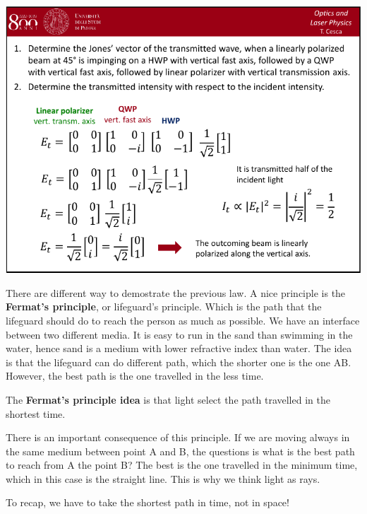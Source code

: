 \documentclass[../main/main.tex]{subfiles}
\begin{document}
\begin{minipage}[]{0.5\linewidth}
\centering
\includegraphics[page=4,width=1\textwidth]{../lessons/pdf_file/04_lecture.pdf}
\end{minipage}
\hspace{0.3cm}\vspace{0.3cm}
\begin{minipage}[c]{0.47\linewidth}

There are different way to demostrate the previous law. A nice principle is the \textbf{Fermat's principle}, or lifeguard's principle. Which is the path that the lifeguard should do to reach the person as much as possible. We have an interface between two different media. It is easy to run in the sand than swimming in the water, hence sand is a medium with lower refractive index than water. The idea is that the lifeguard can do different path, which the shorter one is the one AB. However, the best path is the one travelled in the less time.

The \textbf{Fermat's principle idea} is that light select the path travelled in the shortest time.

\end{minipage}

There is an important consequence of this principle. If we are moving always in the same medium between point A and B, the questions is what is the best path to reach from A the point B? The best is the one travelled in the minimum time, which in this case is the straight line.
This is why we think light as rays.

To recap, we have to take the shortest path in time, not in space!
\end{document}
